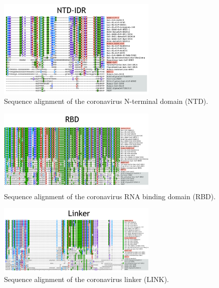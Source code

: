 \documentclass[../main.tex]{subfiles}
\begin{document}
        \begin{figure}[!htb] %
            \centering
            \includegraphics[width=3in]{appendix-e-fig1.png}
            \caption[Sequence alignment of the coronavirus N-terminal domain (NTD).]
                {Sequence alignment of the coronavirus N-terminal domain (NTD).}
            \label{fig:appendix-e-fig1}
        \end{figure}

        \begin{figure}[!htb] %
            \centering
            \includegraphics[width=3in]{appendix-e-fig2.png}
            \caption[Sequence alignment of the coronavirus RNA binding domain (RBD).]
                {Sequence alignment of the coronavirus RNA binding domain (RBD).}
            \label{fig:appendix-e-fig2}
        \end{figure}

        \begin{figure}[!htb] %
            \centering
            \includegraphics[width=3in]{appendix-e-fig3.png}
            \caption[Sequence alignment of the coronavirus linker (LINK).]
                {Sequence alignment of the coronavirus linker (LINK).}
            \label{fig:appendix-e-fig3}
        \end{figure}
\end{document}
